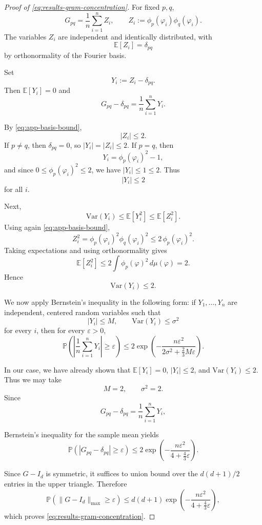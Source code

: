 \begin{proof}[Proof of \eqref{eq:results-gram-concentration}]
	For fixed \(p,q\),
	\[
		G_{pq}
		=
		\frac{1}{n}\sum_{i=1}^n Z_i,
		\qquad
		Z_i:=\phi_p(\varphi_i)\phi_q(\varphi_i).
	\]
	The variables \(Z_i\) are independent and identically distributed, with
	\[
		\mathbb E[Z_i]=\delta_{pq}
	\]
	by orthonormality of the Fourier basis.

	Set
	\[
		Y_i:=Z_i-\delta_{pq}.
	\]
	Then \(\mathbb E[Y_i]=0\) and
	\[
		G_{pq}-\delta_{pq}=\frac{1}{n}\sum_{i=1}^n Y_i.
	\]

	By \eqref{eq:app-basis-bound},
	\[
		|Z_i|\le 2.
	\]
	If \(p\neq q\), then \(\delta_{pq}=0\), so \(|Y_i|=|Z_i|\le 2\). If \(p=q\), then
	\[
		Y_i=\phi_p(\varphi_i)^2-1,
	\]
	and since \(0\le \phi_p(\varphi_i)^2\le 2\), we have \(|Y_i|\le 1\le 2\). Thus
	\[
		|Y_i|\le 2
	\]
	for all \(i\).

	Next,
	\[
		\mathrm{Var}(Y_i)\le \mathbb E[Y_i^2]\le \mathbb E[Z_i^2].
	\]
	Using again \eqref{eq:app-basis-bound},
	\[
		Z_i^2=\phi_p(\varphi_i)^2\phi_q(\varphi_i)^2\le 2\,\phi_p(\varphi_i)^2.
	\]
	Taking expectations and using orthonormality gives
	\[
		\mathbb E[Z_i^2]\le 2\int \phi_p(\varphi)^2\,d\mu(\varphi)=2.
	\]
	Hence
	\[
		\mathrm{Var}(Y_i)\le 2.
	\]

	We now apply Bernstein's inequality \citep{Vershynin_2018a} in the following form: if \(Y_1,\dots,Y_n\) are independent,
	centered random variables such that
	\[
		|Y_i|\le M,
		\qquad
		\mathrm{Var}(Y_i)\le \sigma^2
	\]
	for every \(i\), then for every \(\varepsilon>0\),
	\[
		\mathbb P\!\left(
		\left|\frac{1}{n}\sum_{i=1}^n Y_i\right|
		\ge \varepsilon
		\right)
		\le
		2\exp\!\left(
		-\frac{n\varepsilon^2}{2\sigma^2+\frac{2}{3}M\varepsilon}
		\right).
	\]

	In our case, we have already shown that \(\mathbb E[Y_i]=0\), \(|Y_i|\le 2\), and
	\(\mathrm{Var}(Y_i)\le 2\). Thus we may take
	\[
		M=2,
		\qquad
		\sigma^2=2.
	\]
	Since
	\[
		G_{pq}-\delta_{pq}=\frac{1}{n}\sum_{i=1}^n Y_i,
	\]

	Bernstein's inequality for the sample mean yields
	\[
		\mathbb P\!\left(|G_{pq}-\delta_{pq}|\ge \varepsilon\right)
		\le
		2\exp\!\left(
		-\frac{n\varepsilon^2}{4+\frac43\varepsilon}
		\right).
	\]

	Since \(G-I_d\) is symmetric, it suffices to union bound over the \(d(d+1)/2\) entries in
	the upper triangle. Therefore
	\[
		\mathbb P\!\left(\|G-I_d\|_{\max}\ge \varepsilon\right)
		\le
		d(d+1)\exp\!\left(
		-\frac{n\varepsilon^2}{4+\frac43\varepsilon}
		\right),
	\]
	which proves \eqref{eq:results-gram-concentration}.
\end{proof}

